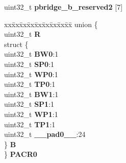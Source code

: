 \begin{DoxyCompactItemize}
\begin{tabbing}
\end{tabbing}\item 
\mbox{\label{structPBRIDGE__B__tag_ad400f35b0db8ab931ee1335abbffad77}} 
uint32\+\_\+t {\bfseries pbridge\+\_\+b\+\_\+reserved2} \mbox{[}7\mbox{]}
\item 
\mbox{\label{structPBRIDGE__B__tag_a072dd3e5b84a45f85c78866f3b2fbb82}} 
\begin{tabbing}
xx\=xx\=xx\=xx\=xx\=xx\=xx\=xx\=xx\=\kill
union \{\\
\>uint32\_t {\bfseries R}\\
\>struct \{\\
\>\>uint32\_t {\bfseries BW0}:1\\
\>\>uint32\_t {\bfseries SP0}:1\\
\>\>uint32\_t {\bfseries WP0}:1\\
\>\>uint32\_t {\bfseries TP0}:1\\
\>\>uint32\_t {\bfseries BW1}:1\\
\>\>uint32\_t {\bfseries SP1}:1\\
\>\>uint32\_t {\bfseries WP1}:1\\
\>\>uint32\_t {\bfseries TP1}:1\\
\>\>uint32\_t {\bfseries \_\_pad0\_\_}:24\\
\>\} {\bfseries B}\\
\} {\bfseries PACR0}\\


\end{tabbing}
\end{DoxyCompactItemize}
